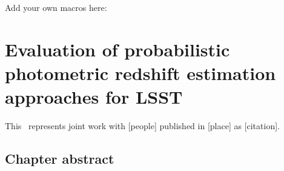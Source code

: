 \renewcommand{\chapid}{pzdc1}


 Add your own macros here:

\newcommand{\kids}{\project{KiDS}}
\newcommand{\hsc}{\project{HSC}}
\newcommand{\wfirst}{\project{WFIRST}}
\newcommand{\buzz}{\project{Buzzard}}

\newcommand{\chisq}{$\chi^{2}$}

\newcommand{\pzcode}[1]{\texttt{#1}}
\newcommand{\annz}{\pzcode{ANNz2}}
\newcommand{\bpz}{\pzcode{BPz}}
\newcommand{\cmnn}{\pzcode{CMNN}}
\newcommand{\delight}{\pzcode{Delight}}
\newcommand{\eazy}{\pzcode{EAZY}}
\newcommand{\flexzboost}{\pzcode{FlexZBoost}}
\newcommand{\gpz}{\pzcode{GPz}}
\newcommand{\lephare}{\pzcode{LePhare}}
\newcommand{\metaphor}{\pzcode{METAPhoR}}
\newcommand{\skynet}{\pzcode{SkyNet}}
\newcommand{\tpz}{\pzcode{TPZ}}
\newcommand{\trainz}{\pzcode{trainZ}}
\def\X{{\mathbf{X}}}
\def\x{{\mathbf{x}}}
\def\E{{\mathbb{E}}}

\chapter{ Evaluation of probabilistic photometric redshift estimation approaches for \textsc{LSST}}

This \paper\ represents joint work with [people] published in [place] as [citation].

\section*{Chapter abstract}

